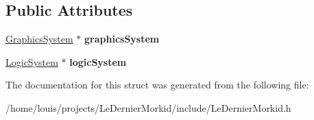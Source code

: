\subsection*{Public Attributes}
\begin{DoxyCompactItemize}
\item 
\mbox{\label{struct_le_dernier_morkid_1_1_le_dernier_morkid_thread_data_a14ad8e710579039f8041e3951b33a14d}} 
\hyperlink{class_common_1_1_graphics_system}{Graphics\+System} $\ast$ {\bfseries graphics\+System}
\item 
\mbox{\label{struct_le_dernier_morkid_1_1_le_dernier_morkid_thread_data_a6e300a8af696aaed836729396ed5f219}} 
\hyperlink{class_common_1_1_logic_system}{Logic\+System} $\ast$ {\bfseries logic\+System}
\end{DoxyCompactItemize}


The documentation for this struct was generated from the following file\+:\begin{DoxyCompactItemize}
\item 
/home/louis/projects/\+Le\+Dernier\+Morkid/include/Le\+Dernier\+Morkid.\+h\end{DoxyCompactItemize}
